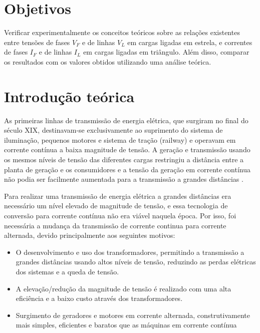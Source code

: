 \documentclass[a4paper,12pt,oneside,openany,table,xcdraw]{article}
\begin{document}
\newcommand{\thedepartment}{Faculdade de Engenharia Elétrica}
\newcommand{\thecourse}{FEELT}
\newcommand{\thetitle}{LABORATÓRIO - CIRCUITOS EQUILIBRADOS}
\newcommand{\thetype}{Relatório da Disciplina de Experimental de Circuitos Elétricos II}
\newcommand{\theproftitle}{Bacharel em Engenharia Elétrica}
\newcommand{\thestudent}{Lesly Viviane Montúfar Berrios\\
\centering11811ETE001}
\newcommand{\theadvisor}{Prof. Wellington Maycon Santos Bernardes}
\newcommand{\thecity}{Uberlândia}

\thispagestyle{empty}


\onehalfspacing
\tableofcontents %
\newpage

\section{Objetivos} %
Verificar experimentalmente os conceitos teóricos sobre as relações existentes entre tensões de fases $V_F$ e de linhas $V_L$ em cargas ligadas em estrela, e correntes de fases $I_F$ e de linhas $I_L$ em cargas ligadas em triângulo. Além disso, comparar os resultados com os valores obtidos utilizando uma análise teórica. 

\section{Introdução teórica} %
As primeiras linhas de transmissão de energia elétrica, que surgiram no final do século XIX, destinavam-se exclusivamente ao suprimento do sistema de iluminação, pequenos motores e sistema de tração (railway) e operavam em corrente contínua a baixa magnitude de tensão. A geração e transmissão usando os mesmos níveis de tensão das diferentes cargas restringiu a distância entre a planta de geração e os consumidores e a tensão da geração em corrente contínua não podia ser facilmente aumentada para a transmissão a grandes distâncias \cite{ph}. 

Para realizar uma transmissão de energia elétrica a grandes distâncias era necessário um nível elevado de magnitude de tensão, e essa tecnologia de conversão para corrente contínua não era viável naquela época. Por isso, foi necessária a mudança da transmissão de corrente continua para corrente alternada, devido principalmente aos seguintes motivos:

\begin{itemize}
\item O desenvolvimento e uso dos transformadores, permitindo a transmissão a grandes distâncias usando altos níveis de tensão, reduzindo as perdas elétricas dos sistemas e a queda de tensão.
\item A elevação/redução da magnitude de tensão é realizado com uma alta eficiência e a baixo custo através dos transformadores.
\item Surgimento de geradores e motores em corrente alternada, construtivamente mais simples, eficientes e baratos que as máquinas em corrente contínua
\end{itemize}
\end{document}
